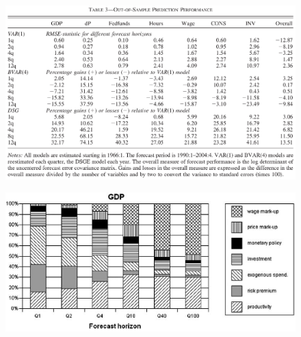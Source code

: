 \documentclass{beamer}
\begin{document}
\begin{frame}
  \begin{figure}
    \includegraphics[scale=.7]{sw_table3.eps}
  \end{figure}
\end{frame}

\begin{frame}
  \begin{figure}
    \includegraphics[scale=.8]{sw_figure1_gdp.eps}
  \end{figure}
\end{frame}
\end{document}
